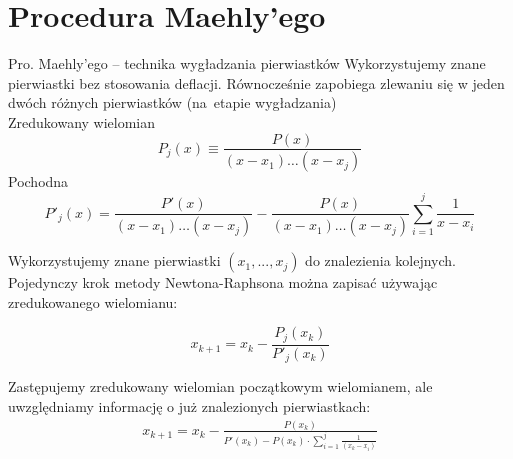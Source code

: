 \section{Procedura Maehly'ego}

\begin{frame}{Pro. Maehly'ego -- technika wygładzania pierwiastków}
Wykorzystujemy znane pierwiastki bez stosowania deflacji.
  Równocześnie zapobiega zlewaniu się w jeden dwóch różnych pierwiastków (na~etapie wygładzania)\\
\vspace{4mm}
Zredukowany wielomian
    $$P_j(x) \equiv \frac{P(x)}{(x - x_1)\ldots(x - x_j)}$$
Pochodna
  $$P'_j(x) = \frac{P'(x)}{(x - x_1)\ldots(x - x_j)} - \frac{P(x)}{(x - x_1)\ldots(x - x_j)} \sum_{i=1}^j \frac{1}{x - x_i}$$
\end{frame}

\begin{frame} 
Wykorzystujemy znane pierwiastki $(x_1 ,..., x_j)$ do znalezienia kolejnych.\\
  Pojedynczy krok metody Newtona-Raphsona można zapisać używając zredukowanego wielomianu:

$$    x_{k+1} = x_k - \frac{P_j(x_k)}{P'_j(x_k)}$$

Zastępujemy zredukowany wielomian początkowym wielomianem, ale uwzględniamy informację o już znalezionych pierwiastkach:
\begin{gather*}
    x_{k+1} = x_k - \frac{P(x_k)}{P'(x_k) - P(x_k) \cdot \sum_{i=1}^{j}\frac{1}{(x_k - x_i)}}
  \end{gather*}

\end{frame}
